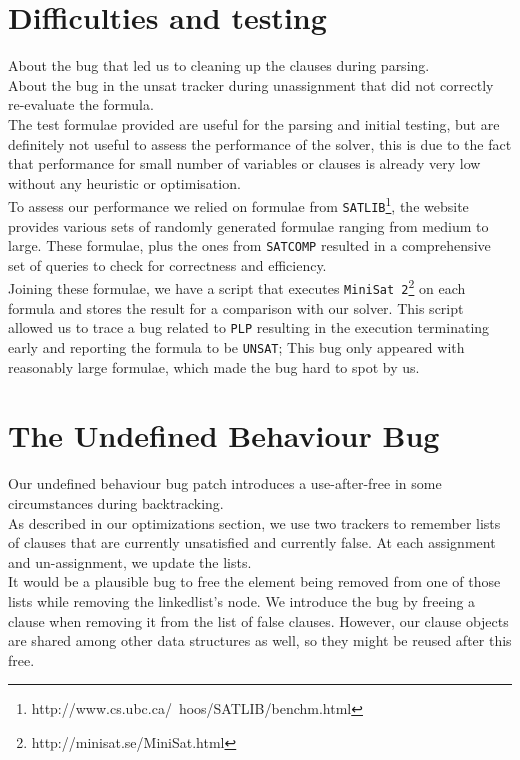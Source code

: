 \documentclass[a4paper]{article}
\begin{document}
\section{Difficulties and testing}

About the bug that led us to cleaning up the clauses during parsing.\\

About the bug in the unsat tracker during unassignment that did not correctly re-evaluate the formula.\\

The test formulae provided are useful for the parsing and initial testing, but are definitely not useful to assess the performance of the solver, this is due to the fact that performance for small number of variables or clauses is already very low without any heuristic or optimisation. \\
To assess our performance we relied on formulae from \texttt{SATLIB}\footnote{http://www.cs.ubc.ca/~hoos/SATLIB/benchm.html}, the website provides various sets of randomly generated formulae ranging from medium to large.
These formulae, plus the ones from \texttt{SATCOMP} resulted in a comprehensive set of queries to check for correctness and efficiency. \\
Joining these formulae, we have a script that executes \texttt{MiniSat 2}\footnote{http://minisat.se/MiniSat.html} on each formula and stores the result for a comparison with our solver.
This script allowed us to trace a bug related to \texttt{PLP} resulting in the execution terminating early and reporting the formula to be \texttt{UNSAT}; This bug only appeared with reasonably large formulae, which made the bug hard to spot by us. \\

\section{The Undefined Behaviour Bug}

Our undefined behaviour bug patch introduces a use-after-free in some circumstances during backtracking.\\

As described in our optimizations section, we use two trackers to remember lists of clauses that are currently unsatisfied and currently false. At each assignment and un-assignment, we update the lists.\\

It would be a plausible bug to free the element being removed from one of those lists while removing the linkedlist's node. We introduce the bug by freeing a clause when removing it from the list of false clauses. However, our clause objects are shared among other data structures as well, so they might be reused after this free.\\
\end{document}
